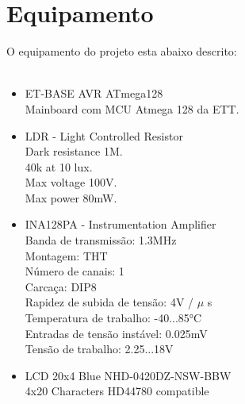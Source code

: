 \section{Equipamento}
{\Large O equipamento do projeto esta abaixo descrito:}\\
\\
\begin{minipage}[t]{.60\linewidth}
	\begin{itemize}
		\setlength\itemsep{-0.3em}
		\item ET-BASE AVR ATmega128 \\
		Mainboard com MCU Atmega 128 da ETT. \\
		\item LDR - Light Controlled Resistor \\
		Dark resistance 1M.\\
		40k at 10 lux.\\
		Max voltage 100V.\\
		Max power 80mW.\\
		\item INA128PA - Instrumentation Amplifier \\
		Banda de transmissão: 1.3MHz \\
		Montagem: THT \\
		Número de canais: 1 \\
		Carcaça: DIP8 \\
		Rapidez de subida de tensão: 4V / $\mu$ s \\
		Temperatura de trabalho: -40...85°C \\
		Entradas de tensão instável: 0.025mV \\
		Tensão de trabalho: 2.25...18V \\
		\item LCD 20x4 Blue NHD-0420DZ-NSW-BBW \\
		4x20 Characters HD44780 compatible\\
	\end{itemize}
\end{minipage}
